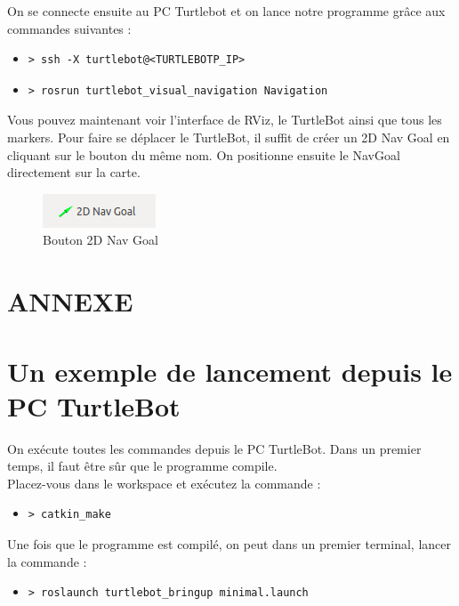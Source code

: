 \documentclass[10pt,a4paper]{article}
\begin{document}
On se connecte ensuite au PC Turtlebot et on lance notre programme grâce aux commandes suivantes :

\begin{itemize}
\item[]  \begin{verbatim}> ssh -X turtlebot@<TURTLEBOTP_IP> \end{verbatim}
\item[]  \begin{verbatim}> rosrun turtlebot_visual_navigation Navigation \end{verbatim}
\end{itemize}

Vous pouvez maintenant voir l'interface de RViz, le TurtleBot ainsi que tous les markers.
Pour faire se déplacer le TurtleBot, il suffit de créer un 2D Nav Goal en cliquant sur le bouton du même nom. On positionne ensuite le NavGoal directement sur la carte.\\

\begin{figure}[h]
 \center
 \includegraphics[scale=0.7]{2DNavGoal.png}
 \caption{Bouton 2D Nav Goal}
\end{figure}


\newpage
\section*{ANNEXE}

\section{Un exemple de lancement depuis le PC TurtleBot}

On exécute toutes les commandes depuis le PC TurtleBot.
Dans un premier temps, il faut être sûr que le programme compile. \\
Placez-vous dans le workspace et exécutez la commande :
\begin{itemize}
\item[] \begin{verbatim}> catkin_make \end{verbatim}
\end{itemize}

Une fois que le programme est compilé, on peut dans un premier terminal, lancer la commande :
\begin{itemize}
\item[] \begin{verbatim}> roslaunch turtlebot_bringup minimal.launch \end{verbatim}
\end{itemize}
\end{document}
